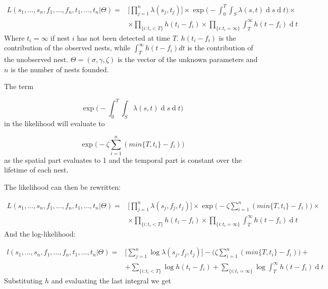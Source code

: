 \documentclass[11pt,a4paper]{article}
\renewcommand{\d}[1]{\ensuremath{\operatorname{d}\!{#1}}}
\begin{document}
\[
\begin{aligned}
L(s_{1}, ..., s_{n}, f_{1}, ..., f_{n}, t_{1}, ..., t_{n} | \Theta) = & \Bigg[ \prod_{j=1}^{n} \lambda(s_{j}, t_{j}) \Bigg] \times \exp \Bigg(- \int_{0}^{T} \int_{S} \lambda(s, t) \d s \d t \Bigg) \times \\ 
& \times \prod_{\{ i : t_{i} < T \} } h (t_{i} - f_{i}) \times \prod_{ \{ i : t_{i} = \infty \} } \int_{T}^{\infty} h(t - f_{i}) \d t
\end{aligned}
\]
Where $t_{i} = \infty$ if nest $i$ has not been detected at time $T$. $h(t_{i} - f_{i})$ is the contribution of the observed nests, while $\int_{T}^{\infty} h(t - f_{i}) dt$ is the contribution of the unobserved nest. $\Theta= ( \sigma, \gamma, \zeta)$ is the vector of the unknown parameters and $n$ is the number of nests founded.

The term 

\begin{equation}
\exp \bigg(- \int_{0}^{T} \int_{S} \lambda(s, t)\d s \d t \bigg)
\end{equation}
in the likelihood will evaluate to 


\[
\exp \bigg(- \zeta \sum_{i=1}^{n} (min\{ T, t_i \} - f_i) \bigg)
\]
as the spatial part evaluates to 1 and the temporal part is constant over the lifetime of each nest.

The likelihood can then be rewritten:

\[
\begin{aligned}
L(s_{1}, ..., s_{n}, f_{1}, ..., f_{n}, t_{1}, ..., t_{n} | \Theta) = & \Bigg[ \prod_{j=1}^{n} \lambda(s_{j},f_{j}, t_{j}) \Bigg] \times \exp \bigg(-\zeta \sum_{i=1}^{n} (min\{ T, t_i \} - f_i) \bigg)  \times \\
& \times \prod_{\{ i : t_{i} < T \} }  h (t_{i} - f_{i}) \times \prod_{ \{ i : t_{i} = \infty \} } \int_{T}^{\infty} h(t - f_{i}) \d t
\end{aligned}
\]
And the log-likelihood:

\[
\begin{aligned}
l(s_{1}, ..., s_{n}, f_{1}, ..., f_{n}, t_{1}, ..., t_{n} | \Theta) = & \Bigg[ \sum_{j=1}^{n} \log \lambda(s_{j},f_{j}, t_{j}) \Bigg] - \bigg(\zeta \sum_{i=1}^{n} (min\{ T, t_i \} - f_i) \bigg)  + \\
& + \sum_{\{ i : t_{i} < T \} }  \log h (t_{i} - f_{i}) + \sum_{ \{ i : t_{i} = \infty \} } \log \int_{T}^{\infty} h(t - f_{i}) \d t
\end{aligned}
\]
Substituting $h$ and evaluating the last integral we get 
\end{document}
